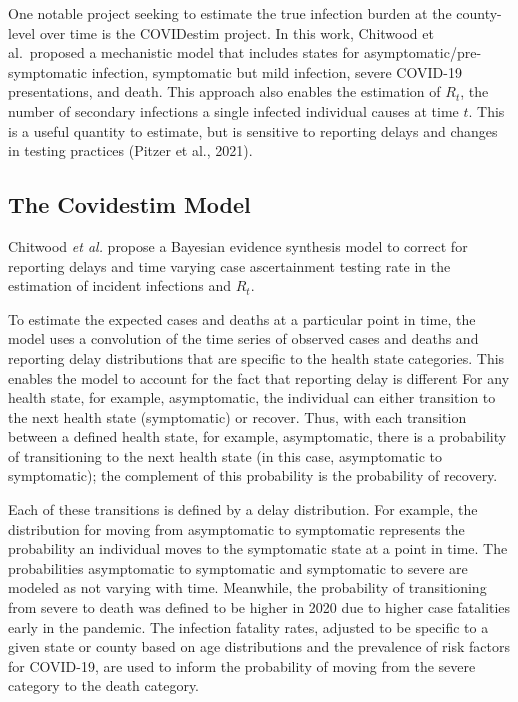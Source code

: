 \documentclass[12pt,twoside]{smiththesis}
\begin{document}
One notable project seeking to estimate the true infection burden at the county-level over time is the COVIDestim project. In this work, Chitwood et al.~proposed a mechanistic model that includes states for asymptomatic/pre-symptomatic infection, symptomatic but mild infection, severe COVID-19 presentations, and death. This approach also enables the estimation of \(R_t\), the number of secondary infections a single infected individual causes at time \(t\). This is a useful quantity to estimate, but is sensitive to reporting delays and changes in testing practices (Pitzer et al., 2021).

\hypertarget{the-covidestim-model}{%
\subsection{The Covidestim Model}\label{the-covidestim-model}}

Chitwood \emph{et al.} propose a Bayesian evidence synthesis model to correct for reporting delays and time varying case ascertainment testing rate in the estimation of incident infections and \(R_t\).

To estimate the expected cases and deaths at a particular point in time, the model uses a convolution of the time series of observed cases and deaths and reporting delay distributions that are specific to the health state categories. This enables the model to account for the fact that reporting delay is different For any health state, for example, asymptomatic, the individual can either transition to the next health state (symptomatic) or recover. Thus, with each transition between a defined health state, for example, asymptomatic, there is a probability of transitioning to the next health state (in this case, asymptomatic to symptomatic); the complement of this probability is the probability of recovery.

Each of these transitions is defined by a delay distribution. For example, the distribution for moving from asymptomatic to symptomatic represents the probability an individual moves to the symptomatic state at a point in time. The probabilities asymptomatic to symptomatic and symptomatic to severe are modeled as not varying with time. Meanwhile, the probability of transitioning from severe to death was defined to be higher in 2020 due to higher case fatalities early in the pandemic. The infection fatality rates, adjusted to be specific to a given state or county based on age distributions and the prevalence of risk factors for COVID-19, are used to inform the probability of moving from the severe category to the death category.
\end{document}
